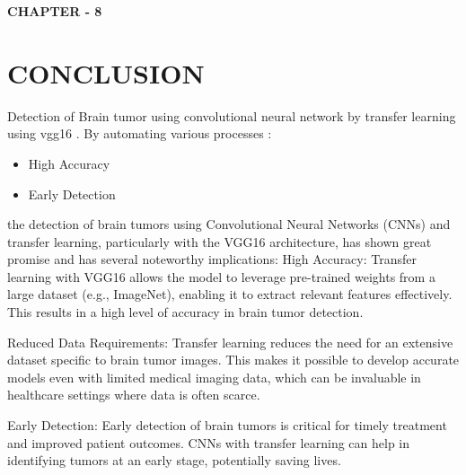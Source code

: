 \newpage

   \begin{center}
    \textbf{\LARGE CHAPTER - 8}
\end{center}
    
\section{CONCLUSION}
Detection of Brain tumor using convolutional neural network by transfer learning using vgg16 . By automating various processes :
\begin{itemize}
    \item High Accuracy
    \item Early Detection
\end{itemize}
 
 the detection of brain tumors using Convolutional Neural Networks (CNNs) and transfer learning, particularly with the VGG16 architecture, has shown great promise and has several noteworthy implications:
High Accuracy: Transfer learning with VGG16 allows the model to leverage pre-trained weights from a large dataset (e.g., ImageNet), enabling it to extract relevant features effectively. This results in a high level of accuracy in brain tumor detection.


Reduced Data Requirements: Transfer learning reduces the need for an extensive dataset specific to brain tumor images. This makes it possible to develop accurate models even with limited medical imaging data, which can be invaluable in healthcare settings where data is often scarce.


Early Detection: Early detection of brain tumors is critical for timely treatment and improved patient outcomes. CNNs with transfer learning can help in identifying tumors at an early stage, potentially saving lives.